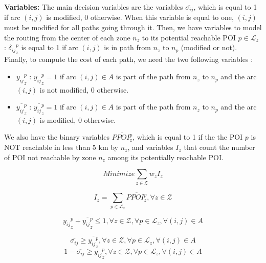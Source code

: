 \textbf{Variables:} The main decision variables are the variables $\overline{\sigma_{ij}}$, which is equal to 1 if arc $(i,j)$ is modified, 0 otherwise. When this variable is equal to one, $(i,j)$ must be modified for all paths going through it. Then, we have variables to model the routing from the center of each zone $n_z$ to its potential reachable POI $p \in \mathcal{L}_z$ : ${\delta_{ij}}_z^p$ is equal to 1 if arc $(i,j)$ is in path from $n_z$ to $n_p$ (modified or not). Finally, to compute the cost of each path, we need the two following variables :
\begin{itemize}
\item ${y_{ij}}_z^p$ : ${y_{ij}}_z^p = 1$ if arc $(i,j) \in A$ is part of the path from $n_z$ to $n_p$ and the arc $(i,j)$ is not modified, $0$ otherwise.
\item $\overline{{y_{ij}}_z^p}$ :  $\overline{{y_{ij}}_z^p} = 1 $ if arc $(i,j) \in A$ is part of the path from $n_z$ to $n_p$  and the arc $(i,j)$ is modified, $0$ otherwise. 
\end{itemize}

We also have the binary variables $\overline{PPOI_z^p}$, which is equal to 1 if the the POI $p$ is NOT reachable in less than 5 km by $n_z$, and variables $I_z$ that count the number of POI not reachable by zone $n_z$ among its potentially reachable POI.

\begin{equation}\label{eq:obj}
Minimize \sum_{z \in \mathcal{Z} } w_z I_z 
\end{equation}

\begin{equation}\label{eq:consIz}
I_z = \sum_{p \in \mathcal{L}_z} \overline{PPOI_z^p}, \forall z \in \mathcal{Z}
\end{equation}

\begin{equation}\label{eq:cons1}
{y_{ij}}_z^p + \overline{{y_{ij}}_z^p} \leq 1,  \forall z \in \mathcal{Z}, \forall p \in \mathcal{L}_z, \forall (i,j) \in A 
\end{equation} 

\begin{equation}\label{eq:cons2}
\overline{\sigma_{ij}} \geq \overline{{y_{ij}}_z^p},  \forall z \in \mathcal{Z}, \forall p \in \mathcal{L}_z, \forall (i,j) \in A 
\end{equation}
\begin{equation}
 1-\overline{\sigma_{ij}} \geq {y_{ij}}_z^p,  \forall z \in \mathcal{Z}, \forall p \in \mathcal{L}_z, \forall (i,j) \in A 
\end{equation}

